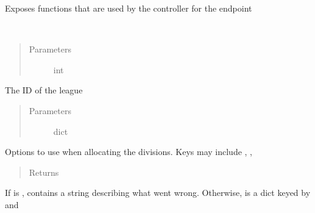 \documentclass[letterpaper,10pt,english]{sphinxmanual}
\begin{document}
Exposes functions that are used by the controller for the  endpoint

\begin{fulllineitems}
\label{\detokenize{tiger_leagues/models/readme:tiger_leagues.models.admin_model.allocate_league_divisions}}~\begin{quote}\begin{description}
\item[{Parameters}] \leavevmode
{} \textendash{} int

\end{description}\end{quote}

The ID of the league
\begin{quote}\begin{description}
\item[{Parameters}] \leavevmode
{} \textendash{} dict

\end{description}\end{quote}

Options to use when allocating the divisions. Keys may include 
, , 
\begin{quote}\begin{description}
\item[{Returns}] \leavevmode
{}

\end{description}\end{quote}

If  is ,  contains a string describing what 
went wrong. 
Otherwise,  is a dict keyed by  and 

\end{fulllineitems}
\end{document}
